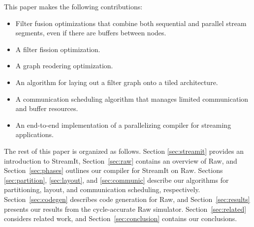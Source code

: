 This paper makes the following contributions:
\begin{itemize}
\item Filter fusion optimizations that combine both sequential and
parallel stream segments, even if there are buffers between nodes.
\item A filter fission optimization.
\item A graph reodering optimization.
\item An algorithm for laying out a filter graph onto a tiled architecture.
\item A communication scheduling algorithm that manages limited 
communication and buffer resources.
\item An end-to-end implementation of a parallelizing compiler for
streaming applications.
\end{itemize}

The rest of this paper is organized as follows.  Section
\ref{sec:streamit} provides an introduction to StreamIt,
Section~\ref{sec:raw} contains an overview of Raw, and
Section~\ref{sec:phases} outlines our compiler for StreamIt on Raw.
Sections \ref{sec:partition}, \ref{sec:layout}, and \ref{sec:communic}
describe our algorithms for partitioning, layout, and communication
scheduling, respectively.  Section~\ref{sec:codegen} describes code
generation for Raw, and Section~\ref{sec:results} presents our results
from the cycle-accurate Raw simulator.  Section~\ref{sec:related}
considers related work, and Section~\ref{sec:conclusion} contains our
conclusions.
